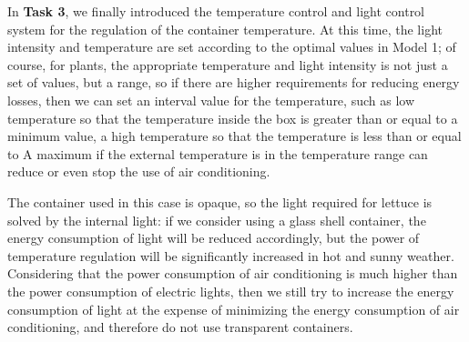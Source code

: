 \begin{itemize}
    In \textbf{Task 3}, we finally introduced the temperature control and light control system for the regulation of the container temperature. At this time, the light intensity and temperature are set according to the optimal values in Model 1; of course, for plants, the appropriate temperature and light intensity is not just a set of values, but a range, so if there are higher requirements for reducing energy losses, then we can set an interval value for the temperature, such as low temperature so that the temperature inside the box is greater than or equal to a minimum value, a high temperature so that the temperature is less than or equal to A maximum if the external temperature is in the temperature range can reduce or even stop the use of air conditioning.
    
    The container used in this case is opaque, so the light required for lettuce is solved by the internal light: if we consider using a glass shell container, the energy consumption of light will be reduced accordingly, but the power of temperature regulation will be significantly increased in hot and sunny weather. Considering that the power consumption of air conditioning is much higher than the power consumption of electric lights, then we still try to increase the energy consumption of light at the expense of minimizing the energy consumption of air conditioning, and therefore do not use transparent containers.
    
\end{itemize}
  


